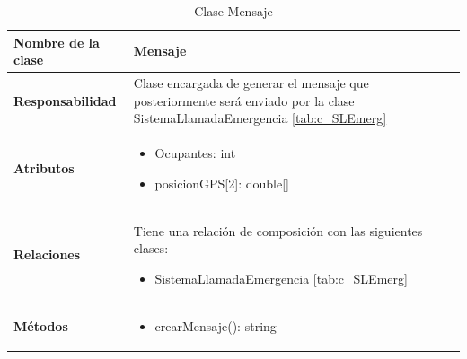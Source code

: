 \begin{table}[h]
\begin{center}
\begin{tabular}{p{} p{11cm}}
\textbf{Nombre de la clase} &  Mensaje\\ \hline \hline
\textbf{Responsabilidad} &   Clase encargada de generar el mensaje que posteriormente será enviado por la clase SistemaLlamadaEmergencia \ref{tab:c_SLEmerg}  \\ \hline
\textbf{Atributos} & \begin{itemize}
                      \item Ocupantes: int
                      \item posicionGPS[2]: double[]
                    \end{itemize}\\ \hline
\textbf{Relaciones} & \par Tiene una relación de composición con las siguientes clases:
                      \begin{itemize}
                        \item SistemaLlamadaEmergencia \ref{tab:c_SLEmerg}
                      \end{itemize}

                      \\ \hline

\textbf{Métodos} &  \begin{itemize}
                      \item crearMensaje(): string
                    \end{itemize}\\ \hline
\end{tabular}
\caption{Clase Mensaje}
\label{tab:c_mensaje}
\end{center}
\end{table}






